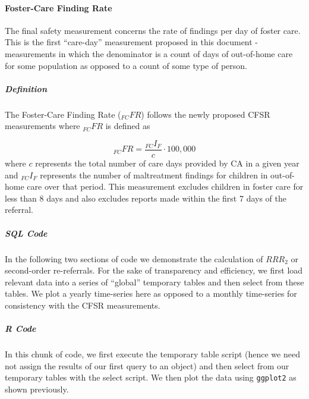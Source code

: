 \documentclass[12pt]{article}\usepackage[]{graphicx}\usepackage[]{color}
\begin{document}
\paragraph{Foster-Care Finding Rate} The final safety measurement concerns the rate of findings per day of foster care. This is the first ``care-day'' measurement proposed in this document - measurements in which the denominator is a count of days of out-of-home care for some population as opposed to a count of some type of person. 

\subparagraph{Definition} The Foster-Care Finding Rate (${}_{FC}FR$) follows the newly proposed CFSR measurements where ${}_{FC}FR$ is defined as 

\begin{equation}\label{eq:_FCFR}
{}_{FC}FR = \frac{{}_{FC}I_F}{c} \cdot 100,000
\end{equation}
where $c$ represents the total number of care days provided by CA in a given year and ${}_{FC}I_F$ represents the number of maltreatment findings for children in out-of-home care over that period. This measurement excludes children in foster care for less than 8 days and also excludes reports made within the first 7 days of the referral. 

\subparagraph{SQL Code}

In the following two sections of code we demonstrate the calculation of $RRR_2$ or second-order re-referrals. For the sake of transparency and efficiency, we first load relevant data into a series of ``global'' temporary tables and then select from these tables. We plot a yearly time-series here as opposed to a monthly time-series for consistency with the CFSR measurements. 





\subparagraph{R Code}

In this chunk of code, we first execute the temporary table script (hence we need not assign the results of our first query to an object) and then select from our temporary tables with the select script. We then plot the data using \texttt{ggplot2} as shown previously. 
\end{document}
